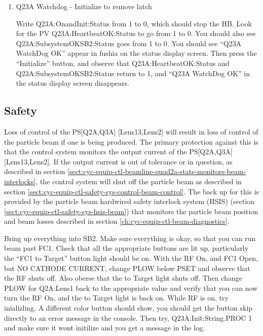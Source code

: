 \documentclass[11pt]{book}		%
\begin{document}
\begin{enumerate}
 \item Q23A Watchdog - Initialize to remove latch

\color{red}
Write Q23A:OnandInit:Status from 1 to 0, which should stop the HB. Look for the PV Q23A:HeartbeatOK:Status to go from 1 to 0. You should also see Q23A:SubsystemOKSB2:Status goes from 1 to 0. You should see ``Q23A WatchDog OK'' appear in fushia on the status display screen. Then press the ``Initialize'' button, and observe that Q23A:HeartbeatOK:Status and Q23A:SubsystemOKSB2:Status return to 1, and ``Q23A WatchDog OK'' in the status display screen disappears.
\color{black}

\end{enumerate}


\subsection{Safety}\label{sect:cyc-equip-ctl-beamline-sm23a-safety}

Loss of control of the PS[Q2A,Q3A] [Lens13,Lens2] will result in loss of control of the particle beam if one is being produced.  The primary protection against this is that the control system monitors the output current of the PS[Q2A,Q3A] [Lens13,Lens2].  If the output current is out of tolerance or in question, as described in section \ref{sect:cyc-equip-ctl-beamline-quad2a-state-monitors-beam-interlocks}, the control system will shut off the particle beam as described in section \ref{sect:cyc-equip-ctl-safety-sys-control-beam-control}.  The back up for this is provided by the particle beam hardwired safety interlock system (HSIS) (section \ref{sect:cyc-equip-ctl-safety-sys-hsis-beam}) that monitors the particle beam position and beam losses described in section \ref{ch:cyc-equip-ctl-beam-diagnostics}.


\color{red}

Bring up everything into SB2. Make sure everything is okay, so that you can run beam past FC1. Check that all the appropriate buttons are lit up, particularly the ``FC1 to Target'' button light should be on. With the RF On, and FC1 Open, but NO CATHODE CURRENT, change PLOW below PSET and observe that the RF shuts off. Also oberse that the to Target light shuts off. Then change PLOW for Q2A:Lens1 back to the appropriate value and verify that you can now turn the RF On, and the to Target light is back on. While RF is on, try inializling. A different color button should show, you should get the button skip directly to an error message in the console. Then try, Q23A:Init:String.PROC 1 and make sure it wont initilize and you get a message in the log.
\end{document}
